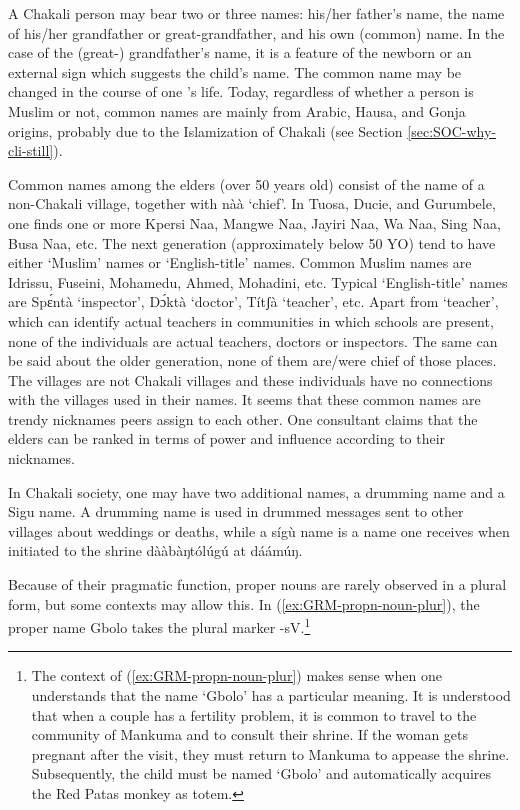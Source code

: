 \begin{exe}
\begin{exe}
\begin{exe}
{\begin{exe}
\begin{exe}
\begin{exe}
\begin{exe}
\begin{exe}
A  Chakali person may bear two or three names: his/her father's name, the name
of his/her grandfather or great-grandfather, and his own (common) name. In the
case of the (great-) grandfather's name, it is a feature of the newborn or an
external sign which suggests the child's name.  The common name may be changed
in
the course of one 's life. Today, regardless of whether a  person is Muslim or
not,
common names are mainly from Arabic, Hausa, and Gonja origins, probably due to
the
Islamization of Chakali (see Section \ref{sec:SOC-why-cli-still}).


Common names among the  elders (over 50 years old) consist of the name of a
non-Chakali village,  together with {\sls nàà} `chief'. In Tuosa, Ducie, and
Gurumbele, one finds one or more Kpersi Naa, Mangwe Naa, Jayiri Naa, Wa Naa, 
Sing Naa,  Busa Naa, etc. The next generation (approximately below 50 YO) tend to
have either `Muslim' names or `English-title' names. Common Muslim names are
Idrissu, Fuseini, Mohamedu, Ahmed, Mohadini, etc.  Typical 
`English-title' names are {\sls Spɛ́ntà} `inspector',  {\sls Dɔ́ktà} 
`doctor', 
{\sls Títʃà} `teacher', etc. Apart from `teacher',  which can identify actual
teachers in communities in which schools are present, none of the individuals
are actual teachers, doctors or inspectors. The same can be said about the older
generation, none of them are/were chief of those places. The villages are not
Chakali villages and these individuals have no connections with the villages
used in their names. It seems that these common names are trendy  nicknames
peers  assign to each other. One consultant claims that the elders can be
ranked in terms of power and influence according to their nicknames. 

In Chakali society, one may have two additional names, a drumming name and a
Sigu name. A drumming name is used in drummed messages sent to other villages
about weddings or deaths,  while a {\sls  sígù} name is a name one receives
when initiated to the shrine {\sls  dààbàŋtólúgú} at {\sls dáámúŋ}. 

Because of their pragmatic function,  proper nouns  are rarely observed in a
plural form, but some contexts may allow this. In
(\ref{ex:GRM-propn-noun-plur}), the proper name {\sls Gbolo} takes the plural
marker {\sls -sV}.\footnote{The context of (\ref{ex:GRM-propn-noun-plur}) makes
sense when one understands that the name `Gbolo' has a particular meaning.  It
is understood that when a couple has a  fertility problem,  it is common to
travel to the community of Mankuma and to consult their shrine. If the woman
gets pregnant after the visit, they must return to Mankuma to appease the
shrine. Subsequently, the child must be named `Gbolo' and automatically acquires
 the Red Patas monkey as  totem.}



\end{exe}
\end{exe}
\end{exe}
\end{exe}
\end{exe}}
\end{exe}
\end{exe}
\end{exe}

